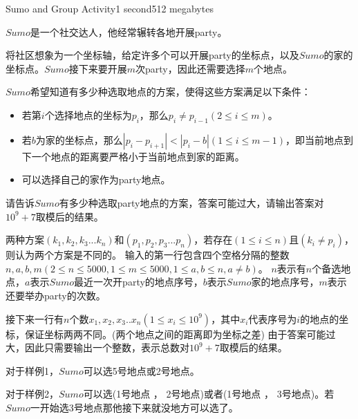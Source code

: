 \documentclass[11pt,a4paper,oneside]{article}
\begin{document}
\begin{problem}{Sumo and Group Activity}{}{}{1 second}{512 megabytes}
	
	$Sumo$是一个社交达人，他经常辗转各地开展party。
	
	将社区想象为一个坐标轴，给定许多个可以开展party的坐标点，以及$Sumo$的家的坐标点。$Sumo$接下来要开展$m$次party，因此还需要选择$m$个地点。
	
	$Sumo$希望知道有多少种选取地点的方案，使得这些方案满足以下条件：
	\begin{itemize}
		\item 若第$i$个选择地点的坐标为$p_i$，那么$p_i\neq p_{i-1}(2\leq i\leq m)$。
		\item 若$b$为家的坐标点，那么$|p_i-p_{i+1}|<|p_i - b|(1\leq i\leq m-1)$，即当前地点到下一个地点的距离要严格小于当前地点到家的距离。
		\item 可以选择自己的家作为party地点。
	\end{itemize}
	请告诉$Sumo$有多少种选取party地点的方案，答案可能过大，请输出答案对$10^9 + 7$取模后的结果。
	
	两种方案$(k_1,k_2,k_3...k_n)$和$(p_1,p_2,p_3...p_n)$，若存在$(1\leq i \leq n)$且$(k_i \neq p_i)$，则认为两个方案是不同的。
	\InputFile
	输入的第一行包含四个空格分隔的整数$n,a,b,m(2\leq n\leq5000,1\leq m\leq 5000,1\leq a,b\leq n,a\neq b)$。
	$n$表示有$n$个备选地点，$a$表示$Sumo$最近一次开party的地点序号，$b$表示$Sumo$家的地点序号，$m$表示还要举办party的次数。
	
	接下来一行有$n$个数$x_1,x_2,x_3..x_n(1\leq x_i\leq 10^9)$，其中$x_i$代表序号为$i$的地点的坐标，保证坐标两两不同。(两个地点之间的距离即为坐标之差)
	\OutputFile
	由于答案可能过大，因此只需要输出一个整数，表示总数对$10^9 + 7$取模后的结果。
	\Examples
	\begin{example}
	\end{example}
	\Note
	对于样例1，$Sumo$可以选5号地点或2号地点。
	
	对于样例2，$Sumo$可以选(1号地点 ， 2号地点)或者(1号地点 ， 3号地点)。若$Sumo$一开始选3号地点那他接下来就没地方可以选了。
	
	
\end{problem}
\end{document}
